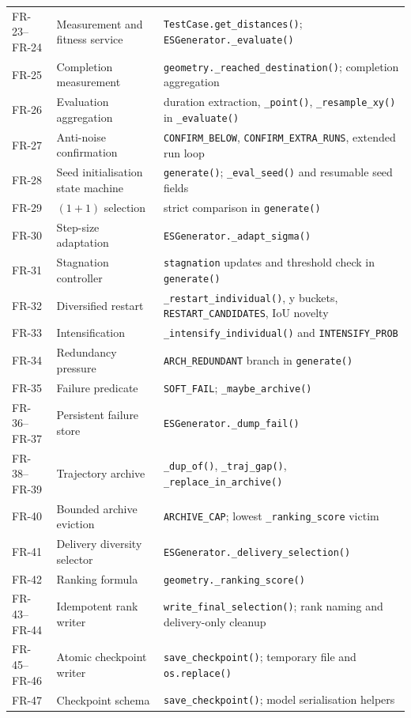 \documentclass[11pt,a4paper]{report}
\newcommand{\code}[1]{\texttt{#1}}
\begin{document}
\begin{longtable}{L{2.3cm} L{4.2cm} L{7.7cm}}
FR-23--FR-24 & Measurement and fitness service & \code{TestCase.get\_distances()}; \code{ESGenerator.\_evaluate()}\\
FR-25 & Completion measurement & \code{geometry.\_reached\_destination()}; completion aggregation\\
FR-26 & Evaluation aggregation & duration extraction, \code{\_point()}, \code{\_resample\_xy()} in \code{\_evaluate()}\\
FR-27 & Anti-noise confirmation & \code{CONFIRM\_BELOW}, \code{CONFIRM\_EXTRA\_RUNS}, extended run loop\\
FR-28 & Seed initialisation state machine & \code{generate()}; \code{\_eval\_seed()} and resumable seed fields\\
FR-29 & $(1+1)$ selection & strict comparison in \code{generate()}\\
FR-30 & Step-size adaptation & \code{ESGenerator.\_adapt\_sigma()}\\
FR-31 & Stagnation controller & \code{stagnation} updates and threshold check in \code{generate()}\\
FR-32 & Diversified restart & \code{\_restart\_individual()}, y buckets, \code{RESTART\_CANDIDATES}, IoU novelty\\
FR-33 & Intensification & \code{\_intensify\_individual()} and \code{INTENSIFY\_PROB}\\
FR-34 & Redundancy pressure & \code{ARCH\_REDUNDANT} branch in \code{generate()}\\
FR-35 & Failure predicate & \code{SOFT\_FAIL}; \code{\_maybe\_archive()}\\
FR-36--FR-37 & Persistent failure store & \code{ESGenerator.\_dump\_fail()}\\
FR-38--FR-39 & Trajectory archive & \code{\_dup\_of()}, \code{\_traj\_gap()}, \code{\_replace\_in\_archive()}\\
FR-40 & Bounded archive eviction & \code{ARCHIVE\_CAP}; lowest \code{\_ranking\_score} victim\\
FR-41 & Delivery diversity selector & \code{ESGenerator.\_delivery\_selection()}\\
FR-42 & Ranking formula & \code{geometry.\_ranking\_score()}\\
FR-43--FR-44 & Idempotent rank writer & \code{write\_final\_selection()}; rank naming and delivery-only cleanup\\
FR-45--FR-46 & Atomic checkpoint writer & \code{save\_checkpoint()}; temporary file and \code{os.replace()}\\
FR-47 & Checkpoint schema & \code{save\_checkpoint()}; model serialisation helpers\\

\end{longtable}
\end{document}
